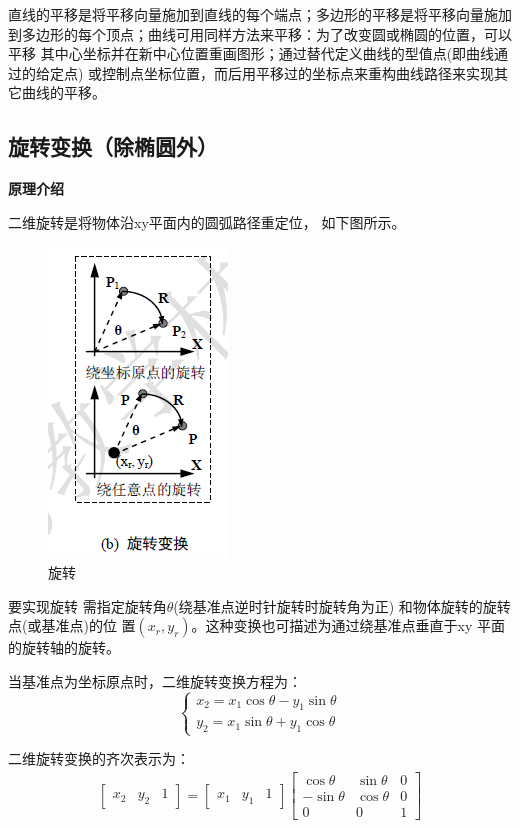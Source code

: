 \documentclass[a4paper,UTF8]{article}
\theoremstyle{definition}
\begin{document}
直线的平移是将平移向量施加到直线的每个端点；多边形的平移是将平移向量施加
到多边形的每个顶点；曲线可用同样方法来平移：为了改变圆或椭圆的位置，可以平移
其中心坐标并在新中心位置重画图形；通过替代定义曲线的型值点(即曲线通过的给定点)
或控制点坐标位置，而后用平移过的坐标点来重构曲线路径来实现其它曲线的平移。\cite{move}
\subsection{旋转变换（除椭圆外）}
\textbf{原理介绍}\par
二维旋转是将物体沿xy平面内的圆弧路径重定位，
如下图所示。
\begin{figure}[h]

    \centering
    \includegraphics[width = .2\textwidth]{rotate.jpg}
    \caption{旋转}
    \label{fig:label7}
\end{figure}
要实现旋转
需指定旋转角$\theta$(绕基准点逆时针旋转时旋转角为正)
和物体旋转的旋转点(或基准点)的位
置$(x_r,y_r)$。这种变换也可描述为通过绕基准点垂直于xy 平面的旋转轴的旋转。

当基准点为坐标原点时，二维旋转变换方程为：
\begin{equation}
    \left\{
                 \begin{array}{lr}
                 x_2 = x_1\cos \theta - y_1 \sin \theta\\
                 y_2 = x_1 \sin \theta + y_1 \cos \theta 
                 \end{array}
    \right.
\end{equation}


二维旋转变换的齐次表示为：
\begin{align}
    \begin{bmatrix} x_2 & y_2& 1  \end{bmatrix} = \begin{bmatrix} x_1& y_1& 1  \end{bmatrix}
    \begin{bmatrix} 
        \cos \theta & \sin \theta & 0 \\
        -\sin\theta & \cos \theta & 0 \\ 
        0 & 0 & 1 
    \end{bmatrix}
\end{align}
\end{document}
